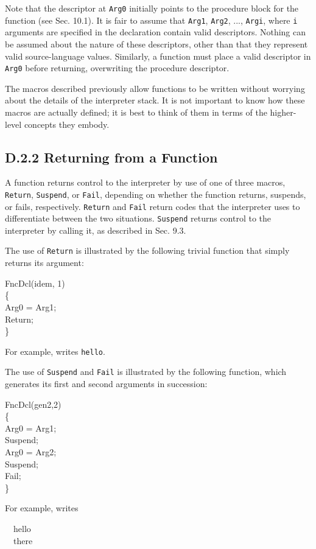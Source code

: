 Note that the descriptor at \texttt{Arg0} initially points to the procedure
block for the function (see Sec. 10.1). It is fair to assume that
\texttt{Arg1}, \texttt{Arg2}, ..., \texttt{Argi}, where \texttt{i}
arguments are specified in the declaration contain valid descriptors.
Nothing can be assumed about the nature of these descriptors, other than
that they represent valid source-language values. Similarly, a function
must place a valid descriptor in \texttt{Arg0} before returning,
overwriting the procedure descriptor.

The macros described previously allow functions to be written without
worrying about the details of the interpreter stack. It is not
important to know how these macros are actually defined; it is best to
think of them in terms of the higher-level concepts they embody.

\subsection[D.2.2 Returning from a Function]{D.2.2 Returning from a Function}

A function returns control to the interpreter by use of one of three macros,
\texttt{Return}, \texttt{Suspend}, or \texttt{Fail}, depending on whether the
function returns, suspends, or fails, respectively. \texttt{Return} and
\texttt{Fail} return codes that the interpreter uses to differentiate between
the two situations. \texttt{Suspend} returns control to the interpreter by
calling it, as described in Sec. 9.3.

The use of \texttt{Return} is illustrated by the following trivial function
that simply returns its argument:
\goodbreak
\begin{iconcode}
\color{red}FncDcl(idem, 1)\\
\{\\
\>Arg0 = Arg1;\\
\>Return;\\
\}
\end{iconcode}
\noindent
For example,
\noindent writes \texttt{hello}.

The use of \texttt{Suspend} and \texttt{Fail} is illustrated by the following function,
which generates its first and second arguments in succession:
\goodbreak
\begin{iconcode}
\color{red}FncDcl(gen2,2)\\
\{\\
\>Arg0 = Arg1;\\
\>Suspend;\\
\>Arg0 = Arg2;\\
\>Suspend;\\
\>Fail;\\
\}
\end{iconcode}
\noindent
For example,
\noindent
writes
\goodbreak
\begin{iconcode}
\ \ hello\\
\ \ there
\end{iconcode}

